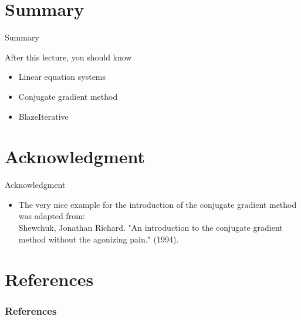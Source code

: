 \documentclass[\classoption]{beamer}
\begin{document}
\section{Summary}
\begin{frame}{Summary}
\begin{block}{After this lecture, you should know}
\begin{itemize}
\item Linear equation systems
\item Conjugate gradient method
\item BlazeIterative
\end{itemize}
\end{block}
\end{frame}


\section*{Acknowledgment}

\begin{frame}{Acknowledgment}
\begin{itemize}
\item The very nice example for the introduction of the conjugate gradient method was adapted from:\\
\vspace{0.25cm}
Shewchuk, Jonathan Richard. "An introduction to the conjugate gradient method without the agonizing pain." (1994).

\end{itemize}
\end{frame}

\section{References}

\begin{frame}[t, allowframebreaks]
\frametitle{References}


\end{frame}
\end{document}

